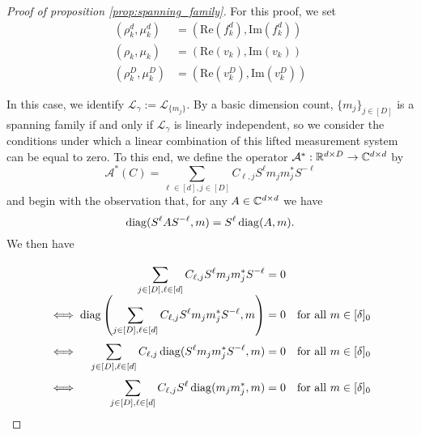 \begin{proof}[Proof of proposition \ref{prop:spanning_family}]
  For this proof, we set \begin{align*} (\rho_k^d, \mu_k^d) &= (\mathrm{Re}(f_k^d), \mathrm{Im}(f_k^d)) \\ (\rho_k, \mu_k) &= (\mathrm{Re}(v_k), \mathrm{Im}(v_k)) \\ (\rho_k^D, \mu_k^D) &= (\mathrm{Re}(v_k^D), \mathrm{Im}(v_k^D)) \end{align*}
  
  In this case, we identify $\mathcal{L}_\gamma := \mathcal{L}_{\{m_j\}}$.  By a basic dimension count, $\{m_j\}_{j \in [D]}$ is a spanning family if and only if $\mathcal{L}_\gamma$ is linearly independent, so we consider the conditions under which a linear combination of this lifted measurement system can be equal to zero.  To this end, we define the operator $\mathcal{A}^* : \mathbb{R}^{d \times D} \to \mathbb{C}^{d \times d}$ by \begin{equation} \mathcal{A}^*(C) = \sum_{\ell \in [d], j \in [D]} C_{\ell, j} S^\ell m_j m_j^* S^{-\ell} \label{eq:synth_op} \end{equation} and begin with the observation that, for any $A \in \mathbb{C}^{d \times d}$ we have \[\operatorname{diag}(S^\ell A S^{-\ell}, m) = S^\ell \operatorname{diag}(A, m).\]  We then have
  \[\arraycolsep=1.4pt\def\arraystretch{2}
  \begin{array}{c>{\displaystyle}rcl@{\quad}r}
    & \sum_{j \in [D], \ell \in [d]} C_{\ell, j} S^\ell m_j m_j^* S^{-\ell} & = & 0 & \\
    \iff & \diag\left(\sum_{j \in [D], \ell \in [d]} C_{\ell, j} S^\ell m_j m_j^* S^{-\ell}, m\right) & = & 0 & \text{for all} \ m \in [\delta]_0 \\
    \iff & \sum_{j \in [D], \ell \in [d]} C_{\ell, j} \diag(S^\ell m_j m_j^* S^{-\ell}, m) & = & 0 & \text{for all} \ m \in [\delta]_0 \\
    \iff & \sum_{j \in [D], \ell \in [d]} C_{\ell, j} S^{\ell} \diag(m_j m_j^*, m) & = & 0 & \text{for all} \ m \in [\delta]_0 \\
  \end{array}\]
  

\end{proof}
